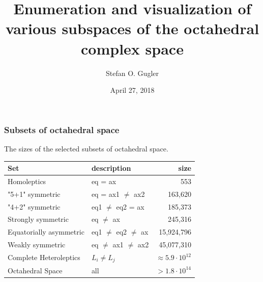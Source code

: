 \documentclass[xcolor=dvipsnames]{beamer}
\title[Meeting 2]{Enumeration and visualization of various subspaces of the octahedral complex space}
\date{April 27, 2018}
\author[Stefan O. Gugler]
{Stefan O. Gugler}
\institute[MIT]{Massachusetts Institute of Technology  \\Department of Chemical Engineering}
\begin{document}
	
\begin{frame}
	\titlepage
\end{frame}
%


\begin{frame}
\frametitle{Subsets of octahedral space}
The sizes of the selected subsets of octahedral space.
\begin{table}[]
	\centering
	\label{tab:space-sizes}
	\begin{tabular}{llr}
		\toprule
		Set 					& description		    	   & size \\
		\midrule
		Homoleptics             & eq = ax                   & 553        \\[0.1cm]
		"5+1" symmetric         & eq = ax1 $\neq$ ax2       & 163,620    \\[0.1cm]
		"4+2" symmetric         & eq1 $\neq$ eq2 = ax       & 185,373    \\[0.1cm]
		Strongly symmetric      & eq $\neq$ ax              & 245,316    \\[0.1cm]
		Equatorially asymmetric & eq1 $\neq$ eq2 $\neq$ ax  & 15,924,796 \\[0.1cm]
		Weakly symmetric        & eq $\neq$ ax1 $\neq$ ax2  & 45,077,310 \\[0.1cm]
		Complete Heteroleptics  & $L_i \neq L_j$            & $\approx 5.9 \cdot 10^{12}$ \\[0.1cm] %
		Octahedral Space        & all                       & $> 1.8 \cdot 10^{14}$ \\
		\bottomrule
	\end{tabular}
	\end{table}
\end{frame}
\end{document}
